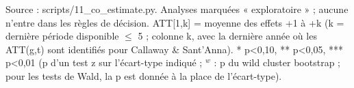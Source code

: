 \begin{table}
\begin{threeparttable}
\begin{tabular}{lp{5.2cm}p{6.2cm}lrrrrrr}
\end{tabular}
\begin{tablenotes}\footnotesize
\item Source : scripts/11\_co\_estimate.py. Analyses marquées « exploratoire » ; aucune n'entre dans les règles de décision. ATT[1,k] = moyenne des effets +1 à +k (k = dernière période disponible $\leq$ 5 ; colonne k, avec la dernière année où les ATT(g,t) sont identifiés pour Callaway \& Sant'Anna). * p<0,10, ** p<0,05, *** p<0,01 (p d'un test z sur l'écart-type indiqué ; $^{w}$ : p du wild cluster bootstrap ; pour les tests de Wald, la p est donnée à la place de l'écart-type).
\end{tablenotes}
\end{threeparttable}
\end{table}
